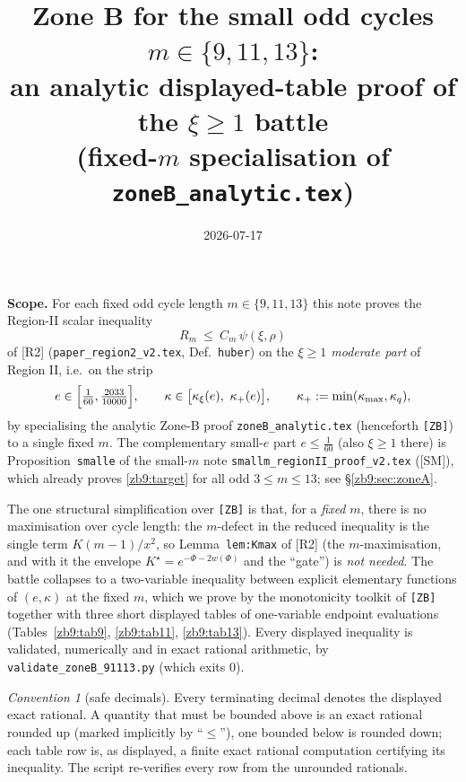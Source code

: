 \documentclass[11pt]{article}
\title{Zone B for the small odd cycles $m\in\{9,11,13\}$:\\
an analytic displayed-table proof of the $\xi\ge1$ battle\\
{\large (fixed-$m$ specialisation of \texttt{zoneB\_analytic.tex})}}
\author{}
\date{2026-07-17}
\theoremstyle{remark}
\newtheorem{convention}[lemma]{Convention}
\newcommand{\kxi}{\kappa_\xi}
\newcommand{\kq}{\kappa_q}
\newcommand{\kmx}{\kappa_{\max}}
\newcommand{\khi}{\kappa_{+}}
\newcommand{\RII}{[R2]}
\newcommand{\SM}{[SM]}
\begin{document}
\maketitle

\noindent
\textbf{Scope.}  For each fixed odd cycle length $m\in\{9,11,13\}$ this note
proves the Region-II scalar inequality
\begin{equation}\label{zb9:target}
        R_m\ \le\ C_m\,\psi(\xi,\rho)
\end{equation}
of \RII{} (\texttt{paper\_region2\_v2.tex}, Def.~\texttt{huber}) on the
\emph{$\xi\ge1$ moderate part} of Region II, i.e.\ on the strip
\[
        e\in\Bigl[\tfrac1{60},\tfrac{2033}{10000}\Bigr],
        \qquad
        \kappa\in\bigl[\kxi(e),\ \khi(e)\bigr],\qquad
        \khi:=\min(\kmx,\kq),
\]
by specialising the analytic Zone-B proof
\texttt{zoneB\_analytic.tex} (henceforth \texttt{[ZB]}) to a single fixed
$m$.  The complementary small-$e$ part $e\le\tfrac1{60}$ (also $\xi\ge1$
there) is Proposition~\texttt{smalle} of the small-$m$ note
\texttt{smallm\_regionII\_proof\_v2.tex} (\SM), which already proves
\eqref{zb9:target} for all odd $3\le m\le13$; see \S\ref{zb9:sec:zoneA}.

The one structural simplification over \texttt{[ZB]} is that, for a
\emph{fixed} $m$, there is no maximisation over cycle length: the $m$-defect
in the reduced inequality is the single term $K(m-1)/x^2$, so
Lemma~\texttt{lem:Kmax} of \RII{} (the $m$-maximisation, and with it the
envelope $K^\star=e^{-\Phi-2w(\Phi)}$ and the ``gate'') is \emph{not needed}.
The battle collapses to a two-variable inequality between explicit
elementary functions of $(e,\kappa)$ at the fixed $m$, which we prove by the
monotonicity toolkit of \texttt{[ZB]} together with three short displayed
tables of one-variable endpoint evaluations (Tables~\ref{zb9:tab9},
\ref{zb9:tab11}, \ref{zb9:tab13}).  Every displayed inequality is validated,
numerically and in exact rational arithmetic, by
\texttt{validate\_zoneB\_91113.py} (which exits $0$).

\begin{convention}[safe decimals]\label{zb9:conv}
Every terminating decimal denotes the displayed exact rational.  A quantity
that must be bounded above is an exact rational rounded up (marked
implicitly by ``$\le$''), one bounded below is rounded down; each table row
is, as displayed, a finite exact rational computation certifying its
inequality.  The script re-verifies every row from the unrounded rationals.
\end{convention}
\end{document}

